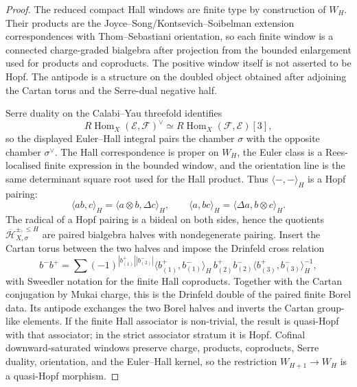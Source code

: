 \begin{proof}
The reduced compact Hall windows are finite type by construction of
\(W_H\). Their products are the Joyce--Song/Kontsevich--Soibelman
extension correspondences with Thom--Sebastiani orientation, so each
finite window is a connected charge-graded bialgebra after projection
from the bounded enlargement used for products and coproducts. The
positive window itself is not asserted to be Hopf.  The antipode is a
structure on the doubled object obtained after adjoining the Cartan
torus and the Serre-dual negative half.

Serre duality on the Calabi--Yau threefold identifies
\[
 R\!\operatorname{Hom}_X(\mathcal E,\mathcal F)^\vee
 \simeq
 R\!\operatorname{Hom}_X(\mathcal F,\mathcal E)[3],
\]
so the displayed Euler--Hall integral pairs the chamber \(\sigma\) with
the opposite chamber \(\sigma^\vee\). The Hall correspondence is proper
on \(W_H\), the Euler class is a Rees-localised finite expression in the
bounded window, and the orientation line is the same determinant square
root used for the Hall product. Thus \(\langle-,-\rangle_H\) is a
Hopf pairing:
\[
 \langle ab,c\rangle_H
 =
 \langle a\otimes b,\Delta c\rangle_H,\qquad
 \langle a,bc\rangle_H
 =
 \langle\Delta a,b\otimes c\rangle_H .
\]
The radical of a Hopf pairing is a biideal on both sides, hence the
quotients \(\overline{\mathcal H}^{\pm,\leq H}_{X,\sigma}\) are paired
bialgebra halves with nondegenerate pairing. Insert the Cartan torus
between the two halves and impose the Drinfeld cross relation
\[
 b^- b^+
 =
 \sum
 (-1)^{|b^+_{(1)}||b^-_{(2)}|}
 \langle b^+_{(1)},b^-_{(1)}\rangle_H\,
 b^+_{(2)}b^-_{(2)}
 \langle b^+_{(3)},b^-_{(3)}\rangle_H^{-1},
\]
with Sweedler notation for the finite Hall coproducts. Together with
the Cartan conjugation by Mukai charge, this is the Drinfeld double of
the paired finite Borel data. Its antipode exchanges the two Borel
halves and inverts the Cartan group-like elements. If the finite Hall
associator is non-trivial, the result is quasi-Hopf with that
associator; in the strict associator stratum it is Hopf. Cofinal
downward-saturated windows preserve charge, products, coproducts,
Serre duality, orientation, and the Euler--Hall kernel, so the
restriction \(W_{H+1}\to W_H\) is a quasi-Hopf morphism.
\end{proof}

